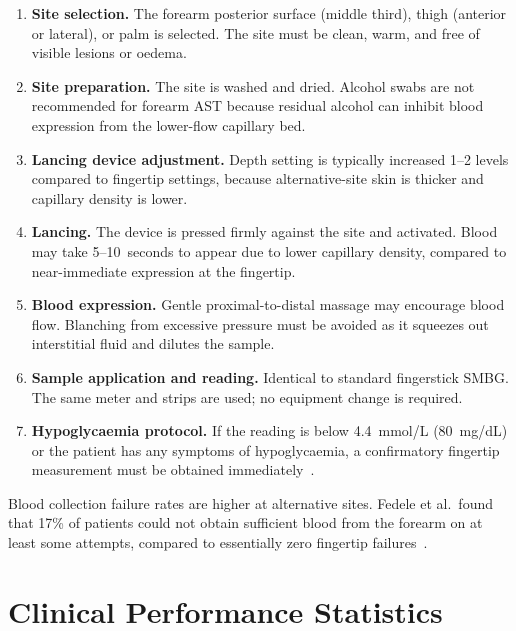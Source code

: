 \begin{enumerate}
  \item \textbf{Site selection.} The forearm posterior surface (middle third), thigh (anterior or lateral), or palm is selected. The site must be clean, warm, and free of visible lesions or oedema.
  \item \textbf{Site preparation.} The site is washed and dried. Alcohol swabs are not recommended for forearm AST because residual alcohol can inhibit blood expression from the lower-flow capillary bed.
  \item \textbf{Lancing device adjustment.} Depth setting is typically increased 1--2 levels compared to fingertip settings, because alternative-site skin is thicker and capillary density is lower.
  \item \textbf{Lancing.} The device is pressed firmly against the site and activated. Blood may take 5--10~seconds to appear due to lower capillary density, compared to near-immediate expression at the fingertip.
  \item \textbf{Blood expression.} Gentle proximal-to-distal massage may encourage blood flow. Blanching from excessive pressure must be avoided as it squeezes out interstitial fluid and dilutes the sample.
  \item \textbf{Sample application and reading.} Identical to standard fingerstick SMBG. The same meter and strips are used; no equipment change is required.
  \item \textbf{Hypoglycaemia protocol.} If the reading is below 4.4~mmol/L (80~mg/dL) or the patient has any symptoms of hypoglycaemia, a confirmatory fingertip measurement must be obtained immediately~\cite{ast_review2009}.
\end{enumerate}

Blood collection failure rates are  higher at alternative sites. Fedele et al.\ found that 17\% of patients could not obtain sufficient blood from the forearm on at least some attempts, compared to essentially zero fingertip failures~\cite{fedele2003}.

\section{Clinical Performance Statistics}

